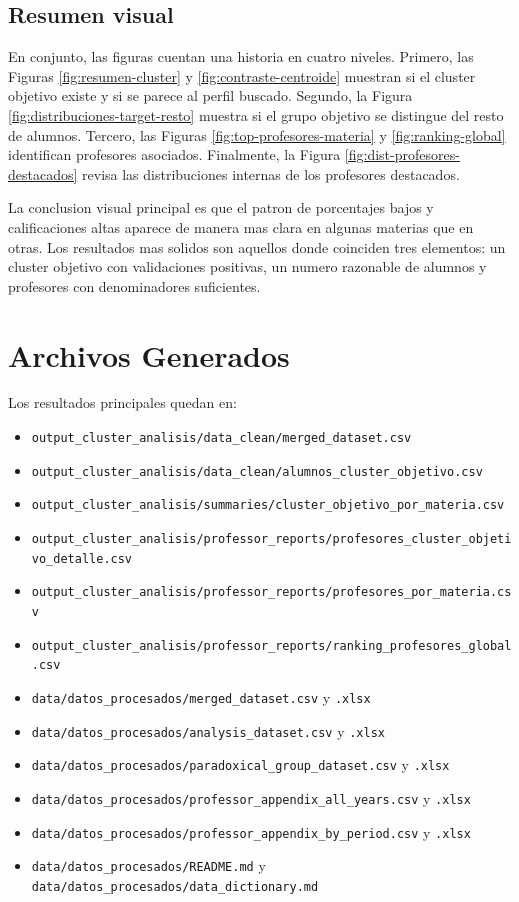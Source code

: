 \documentclass[11pt,letterpaper]{article}
\newcommand{\code}[1]{\texttt{#1}}
\begin{document}
\subsection{Resumen visual}

En conjunto, las figuras cuentan una historia en cuatro niveles. Primero, las Figuras \ref{fig:resumen-cluster} y \ref{fig:contraste-centroide} muestran si el cluster objetivo existe y si se parece al perfil buscado. Segundo, la Figura \ref{fig:distribuciones-target-resto} muestra si el grupo objetivo se distingue del resto de alumnos. Tercero, las Figuras \ref{fig:top-profesores-materia} y \ref{fig:ranking-global} identifican profesores asociados. Finalmente, la Figura \ref{fig:dist-profesores-destacados} revisa las distribuciones internas de los profesores destacados.

La conclusion visual principal es que el patron de porcentajes bajos y calificaciones altas aparece de manera mas clara en algunas materias que en otras. Los resultados mas solidos son aquellos donde coinciden tres elementos: un cluster objetivo con validaciones positivas, un numero razonable de alumnos y profesores con denominadores suficientes.


\section{Archivos Generados}

Los resultados principales quedan en:

\begin{itemize}
    \item \code{output\_cluster\_analisis/data\_clean/merged\_dataset.csv}
    \item \code{output\_cluster\_analisis/data\_clean/alumnos\_cluster\_objetivo.csv}
    \item \code{output\_cluster\_analisis/summaries/cluster\_objetivo\_por\_materia.csv}
    \item \code{output\_cluster\_analisis/professor\_reports/profesores\_cluster\_objetivo\_detalle.csv}
    \item \code{output\_cluster\_analisis/professor\_reports/profesores\_por\_materia.csv}
    \item \code{output\_cluster\_analisis/professor\_reports/ranking\_profesores\_global.csv}
    \item \code{data/datos\_procesados/merged\_dataset.csv} y \code{.xlsx}
    \item \code{data/datos\_procesados/analysis\_dataset.csv} y \code{.xlsx}
    \item \code{data/datos\_procesados/paradoxical\_group\_dataset.csv} y \code{.xlsx}
    \item \code{data/datos\_procesados/professor\_appendix\_all\_years.csv} y \code{.xlsx}
    \item \code{data/datos\_procesados/professor\_appendix\_by\_period.csv} y \code{.xlsx}
    \item \code{data/datos\_procesados/README.md} y \code{data/datos\_procesados/data\_dictionary.md}
\end{itemize}
\end{document}
